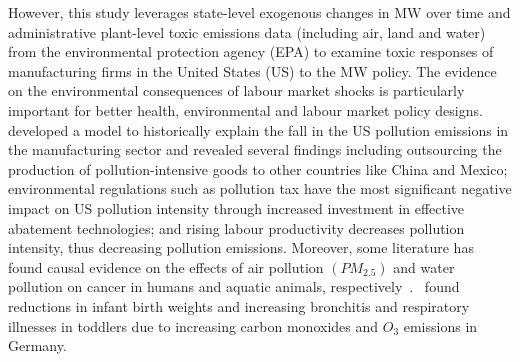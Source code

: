 \documentclass[12pt, english]{article}
\begin{document}
    However, this study leverages state-level exogenous changes in MW over time and administrative plant-level toxic emissions data (including air, land and water) from the environmental protection agency (EPA) to examine toxic responses of manufacturing firms in the United States (US) to the MW policy. The evidence on the environmental consequences of labour market shocks is particularly important for better health, environmental and labour market policy designs.~\cite{shapiro2018pollution} developed a model to historically explain the fall in the US pollution emissions in the manufacturing sector and revealed several findings including outsourcing the production of pollution-intensive goods to other countries like China and Mexico; environmental regulations such as pollution tax have the most significant negative impact on US pollution intensity through increased investment in effective abatement technologies; and rising labour productivity decreases pollution intensity, thus decreasing pollution emissions. Moreover, some literature has found causal evidence on the effects of air pollution $(PM_{2.5})$ and water pollution on cancer in humans and aquatic animals, respectively~\parencite{turner2020outdoor, turner2017ambient, baines2021linking}.~\cite{coneus2012pollution} found reductions in infant birth weights and increasing bronchitis and respiratory illnesses in toddlers due to increasing carbon monoxides and $O_{3}$ emissions in Germany.
\end{document}
